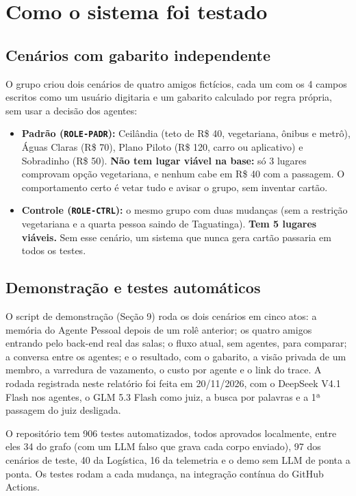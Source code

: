 \documentclass[12pt,a4paper]{article}
\begin{document}
\section{Como o sistema foi testado}
\subsection{Cenários com gabarito independente}
O grupo criou dois cenários de quatro amigos fictícios, cada um com os 4 campos escritos como um usuário digitaria e um gabarito calculado por regra própria, sem usar a decisão dos agentes:

\begin{itemize}
\item \textbf{Padrão (\texttt{ROLE-PADR}):} Ceilândia (teto de R\$ 40, vegetariana, ônibus e metrô), Águas Claras (R\$ 70), Plano Piloto (R\$ 120, carro ou aplicativo) e Sobradinho (R\$ 50). \textbf{Não tem lugar viável na base:} só 3 lugares comprovam opção vegetariana, e nenhum cabe em R\$ 40 com a passagem. O comportamento certo é vetar tudo e avisar o grupo, sem inventar cartão.
\item \textbf{Controle (\texttt{ROLE-CTRL}):} o mesmo grupo com duas mudanças (sem a restrição vegetariana e a quarta pessoa saindo de Taguatinga). \textbf{Tem 5 lugares viáveis.} Sem esse cenário, um sistema que nunca gera cartão passaria em todos os testes.
\end{itemize}

\subsection{Demonstração e testes automáticos}
O script de demonstração (Seção 9) roda os dois cenários em cinco atos: a memória do Agente Pessoal depois de um rolê anterior; os quatro amigos entrando pelo back-end real das salas; o fluxo atual, sem agentes, para comparar; a conversa entre os agentes; e o resultado, com o gabarito, a visão privada de um membro, a varredura de vazamento, o custo por agente e o link do trace. A rodada registrada neste relatório foi feita em 20/11/2026, com o DeepSeek V4.1 Flash nos agentes, o GLM 5.3 Flash como juiz, a busca por palavras e a 1ª passagem do juiz desligada.

O repositório tem 906 testes automatizados, todos aprovados localmente, entre eles 34 do grafo (com um LLM falso que grava cada corpo enviado), 97 dos cenários de teste, 40 da Logística, 16 da telemetria e o demo sem LLM de ponta a ponta. Os testes rodam a cada mudança, na integração contínua do GitHub Actions.
\end{document}
